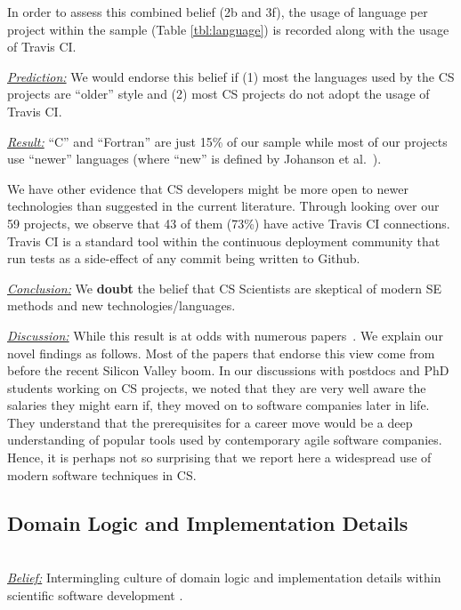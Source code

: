 \documentclass[sigconf,review,anonymous]{acmart}
\newenvironment{RQ}{\vspace{1mm}\begin{tcolorbox}[enhanced,width=3.4in,size=fbox,colback=red!5!white,drop shadow southwest,sharp corners]}{\end{tcolorbox}}
\begin{document}
In order to assess this combined belief (2b and 3f), the usage of language per project within the sample (Table \ref{tbl:language}) is recorded along with the usage of Travis CI.

\noindent \textit{\underline{Prediction:}} We would endorse this belief if (1) most the languages used by the CS projects are ``older'' style and (2) most CS projects do not adopt the usage of Travis CI. 


\noindent \textit{\underline{Result:}} 
``C'' and ``Fortran'' are just 15\% of our sample
while most of our projects use ``newer''
languages (where ``new'' is defined by Johanson et al.~\cite{johan18_secs}).

We have other evidence that CS developers might be more open to newer
technologies than suggested in the current literature. Through looking over
our 59 projects, we observe that 43 of them (73\%) have active
Travis CI connections. Travis CI is a standard tool within the continuous deployment community  that run tests as a side-effect
of any commit being written to Github. 

\begin{RQ} 
\textit{\underline{Conclusion:}} We \textbf{doubt} the belief that 
CS Scientists are skeptical of modern SE methods and new technologies/languages.
\end{RQ}
 
 \noindent \textit{\underline{Discussion:}} While this result is at odds
 with  numerous papers~\cite{basili08_hpc, carver07_environment, Prabhu11_cssurvey, kendall05_C, ragan14_pythoncs}. We explain our novel findings as follows. 
 Most of the papers that endorse this view come from before the recent Silicon Valley boom. In our discussions with postdocs and PhD students working on CS projects,
 we noted that they are very well aware the salaries they might earn if,
 they moved on to software companies later in life.
 They understand that the prerequisites for a career move would be a deep understanding of popular tools used by contemporary agile software companies. Hence, it is perhaps not so surprising that we report here a widespread use of modern software techniques in CS.
 
 
\subsection{Domain Logic and Implementation Details}~\\
\noindent \textit{\underline{Belief:}} Intermingling culture of domain logic and implementation details within scientific software development \cite{faulk09_secs}.
\end{document}
